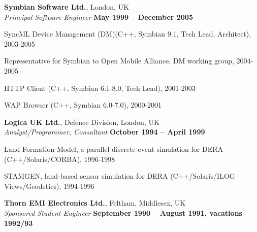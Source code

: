 \documentclass[line]{resume}
\begin{document}
\begin{resume}
    \textbf{Symbian Software Ltd.}, London, UK \vspace{2mm}\\\vspace{1mm}%
    \textsl{Principal Software Engineer} \hfill \textbf{May 1999 -- December 2005}\vspace{-3mm}\\\vspace{-1mm}%
    \begin{list2}
        \item SyncML Device Management (DM)(C++, Symbian 9.1, Tech Lead, Architect), 2003-2005
        \item Representative for Symbian to Open Mobile Alliance, DM working group, 2004-2005
        \item HTTP Client (C++, Symbian 6.1-8.0, Tech Lead), 2001-2003
        \item WAP Browser (C++, Symbian 6.0-7.0), 2000-2001
    \end{list2}\vspace{-1.5mm}

    \textbf{Logica UK Ltd.}, Defence Division, London, UK \vspace{2mm}\\\vspace{1mm}%
    \textsl{Analyst/Programmer, Consultant} \hfill \textbf{October 1994 -- April 1999}\vspace{-3mm}\\\vspace{-1mm}%
    \begin{list2}
        \item Land Formation Model, a parallel discrete event simulation for DERA (C++/Solaris/CORBA), 1996-1998
        \item STAMGEN, land-based sensor simulation for DERA (C++/Solaris/ILOG Views/Geodetics), 1994-1996
    \end{list2}\vspace{-1.5mm}

    \textbf{Thorn EMI Electronics Ltd.}, Feltham, Middlesex, UK \vspace{2mm}\\\vspace{1mm}%
    \textsl{Sponsored Student Engineer} \hfill \textbf{September 1990 -- August 1991, vacations 1992/93}\vspace{-3mm}\\\vspace{-1mm}%
    \vspace{-1.5mm}



\end{resume}
\end{document}
